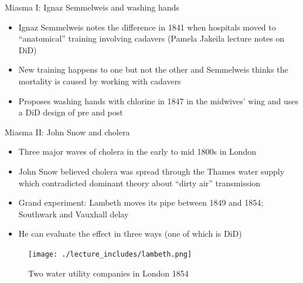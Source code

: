 \documentclass{beamer}
\begin{document}
\begin{frame}{Miasma I: Ignaz Semmelweis and washing hands}

\begin{itemize}
\item Ignaz Semmelweis notes the difference in 1841 when hospitals moved to ``anatomical'' training involving cadavers (Pamela Jakeila lecture notes on DiD)
\item New training happens to one but not the other and Semmelweis thinks the mortality is caused by working with cadavers
\item Proposes washing hands with chlorine in 1847 in the midwives' wing and uses a DiD design of pre and post
\end{itemize}

\end{frame}



\begin{frame}{Miasma II: John Snow and cholera}

\begin{itemize}
\item Three major waves of cholera in the early to mid 1800s in London
\item John Snow believed cholera was spread through the Thames water supply which contradicted dominant theory about ``dirty air'' transmission
\item Grand experiment: Lambeth moves its pipe between 1849 and 1854; Southwark and Vauxhall delay
\item He can evaluate the effect in three ways (one of which is DiD)
\end{itemize}

\end{frame}


\begin{frame}

	\begin{figure}
	\caption{Two water utility companies in London 1854}
	\texttt{[image: ./lecture\_includes/lambeth.png]}
	\end{figure}


\end{frame}
\end{document}
